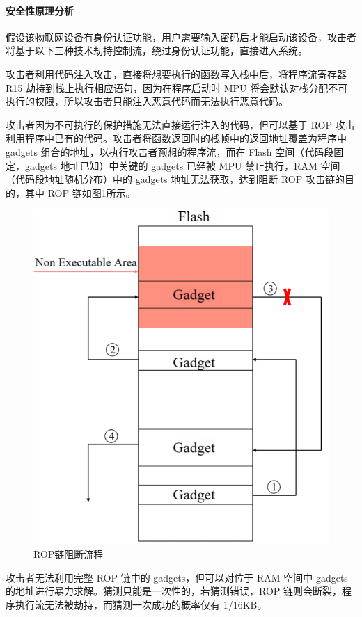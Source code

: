 \documentclass[UTF8,12pt,a4paper,twoside]{ctexart}
\numberwithin{figure}{section}
\begin{document}
\paragraph{安全性原理分析}
\par 假设该物联网设备有身份认证功能，用户需要输入密码后才能启动该设备，攻击者将基于以下三种技术劫持控制流，绕过身份认证功能，直接进入系统。
\par 攻击者利用代码注入攻击，直接将想要执行的函数写入栈中后，将程序流寄存器R15 劫持到栈上执行相应语句，因为在程序启动时 MPU 将会默认对栈分配不可执行的权限，所以攻击者只能注入恶意代码而无法执行恶意代码。
\par 攻击者因为不可执行的保护措施无法直接运行注入的代码，但可以基于 ROP 攻击利用程序中已有的代码。攻击者将函数返回时的栈帧中的返回地址覆盖为程序中gadgets 组合的地址，以执行攻击者预想的程序流，而在 Flash 空间（代码段固定，gadgets 地址已知）中关键的 gadgets 已经被 MPU 禁止执行，RAM 空间（代码段地址随机分布）中的 gadgets 地址无法获取，达到阻断 ROP 攻击链的目的，其中 ROP 链如图\ref{ROP blocking process}所示。
\begin{figure}[H]
    \centering
    \includegraphics[scale=0.55]{graph/ROP blocking process.png}
    \caption{ROP链阻断流程}
    \label{ROP blocking process}
\end{figure}
\par 攻击者无法利用完整 ROP 链中的 gadgets，但可以对位于 RAM 空间中 gadgets 的地址进行暴力求解。猜测只能是一次性的，若猜测错误，ROP 链则会断裂，程序执行流无法被劫持，而猜测一次成功的概率仅有 1/16KB。
\end{document}
